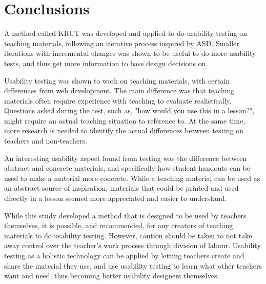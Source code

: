 \chapter{Conclusions}
A method called KRUT was developed and applied to do usability testing on teaching materials, following an iterative process inspired by ASD. Smaller iterations with incremental changes was shown to be useful to do more usability tests, and thus get more information to base design decisions on.

Usability testing was shown to work on teaching materials, with certain differences from web development. The main difference was that teaching materials often require experience with teaching to evaluate realistically. Questions asked during the test, such as, "how would you use this in a lesson?", might require an actual teaching situation to reference to. At the same time, more research is needed to identify the actual differences between testing on teachers and non-teachers.

An interesting usability aspect found from testing was the difference between abstract and concrete materials, and specifically how student handouts can be used to make a material more concrete. While a teaching material can be used as an abstract source of inspiration, materials that could be printed and used directly in a lesson seemed more appreciated and easier to understand.

While this study developed a method that is designed to be used by teachers themselves, it is possible, and recommended, for any creators of teaching materials to do usability testing. However, caution should be taken to not take away control over the teacher's work process through division of labour. Usability testing as a holistic technology can be applied by letting teachers create and share the material they use, and use usability testing to learn what other teachers want and need, thus becoming better usability designers themselves.
